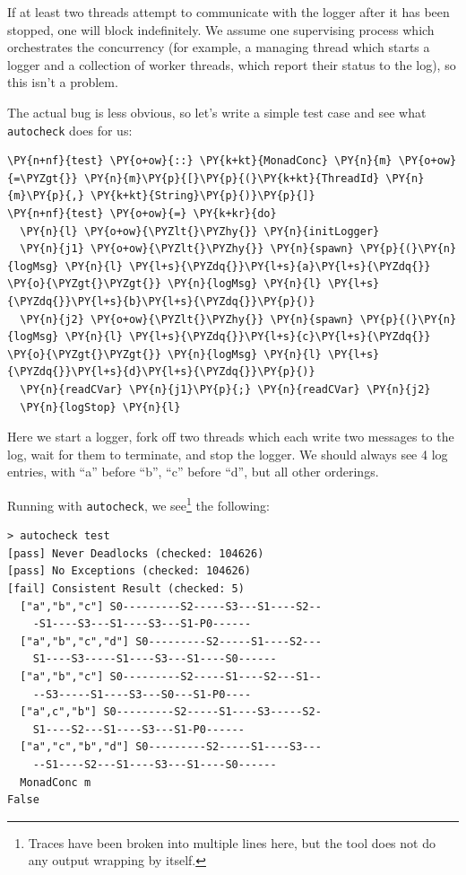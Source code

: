 If at least two threads attempt to communicate with the logger after
it has been stopped, one will block indefinitely. We assume one
supervising process which orchestrates the concurrency (for example, a
managing thread which starts a logger and a collection of worker
threads, which report their status to the log), so this isn't a
problem.

The actual bug is less obvious, so let's write a simple test case and
see what \texttt{autocheck} does for us:


\begin{Verbatim}[commandchars=\\\{\}]
\PY{n+nf}{test} \PY{o+ow}{::} \PY{k+kt}{MonadConc} \PY{n}{m} \PY{o+ow}{=\PYZgt{}} \PY{n}{m}\PY{p}{[}\PY{p}{(}\PY{k+kt}{ThreadId} \PY{n}{m}\PY{p}{,} \PY{k+kt}{String}\PY{p}{)}\PY{p}{]}
\PY{n+nf}{test} \PY{o+ow}{=} \PY{k+kr}{do}
  \PY{n}{l} \PY{o+ow}{\PYZlt{}\PYZhy{}} \PY{n}{initLogger}
  \PY{n}{j1} \PY{o+ow}{\PYZlt{}\PYZhy{}} \PY{n}{spawn} \PY{p}{(}\PY{n}{logMsg} \PY{n}{l} \PY{l+s}{\PYZdq{}}\PY{l+s}{a}\PY{l+s}{\PYZdq{}} \PY{o}{\PYZgt{}\PYZgt{}} \PY{n}{logMsg} \PY{n}{l} \PY{l+s}{\PYZdq{}}\PY{l+s}{b}\PY{l+s}{\PYZdq{}}\PY{p}{)}
  \PY{n}{j2} \PY{o+ow}{\PYZlt{}\PYZhy{}} \PY{n}{spawn} \PY{p}{(}\PY{n}{logMsg} \PY{n}{l} \PY{l+s}{\PYZdq{}}\PY{l+s}{c}\PY{l+s}{\PYZdq{}} \PY{o}{\PYZgt{}\PYZgt{}} \PY{n}{logMsg} \PY{n}{l} \PY{l+s}{\PYZdq{}}\PY{l+s}{d}\PY{l+s}{\PYZdq{}}\PY{p}{)}
  \PY{n}{readCVar} \PY{n}{j1}\PY{p}{;} \PY{n}{readCVar} \PY{n}{j2}
  \PY{n}{logStop} \PY{n}{l}
\end{Verbatim}

Here we start a logger, fork off two threads which each write two
messages to the log, wait for them to terminate, and stop the
logger. We should always see 4 log entries, with ``a'' before ``b'',
``c'' before ``d'', but all other orderings.

Running with \texttt{autocheck}, we see\footnote{Traces have been
  broken into multiple lines here, but the tool does not do any output
  wrapping by itself.} the following:

\begin{verbatim}
> autocheck test
[pass] Never Deadlocks (checked: 104626)
[pass] No Exceptions (checked: 104626)
[fail] Consistent Result (checked: 5)
  ["a","b","c"] S0---------S2-----S3---S1----S2--
    -S1----S3---S1----S3---S1-P0------
  ["a","b","c","d"] S0---------S2-----S1----S2---
    S1----S3-----S1----S3---S1----S0------
  ["a","b","c"] S0---------S2-----S1----S2---S1--
    --S3-----S1----S3---S0---S1-P0----
  ["a",c","b"] S0---------S2-----S1----S3-----S2-
    S1----S2---S1----S3---S1-P0------
  ["a","c","b","d"] S0---------S2-----S1----S3---
    --S1----S2---S1----S3---S1----S0------
  MonadConc m
False
\end{verbatim}

